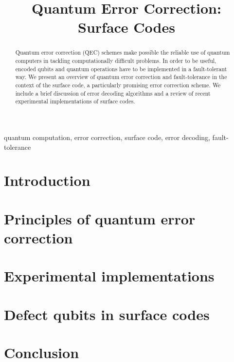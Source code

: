 \documentclass[conference]{IEEEtran}
\begin{document}
\title{Quantum Error Correction: Surface Codes}

\author{

  \and

}

\maketitle


\begin{abstract}
  Quantum error correction (QEC) schemes make possible the reliable use of
  quantum computers in tackling computationally difficult problems. In order to
  be useful, encoded qubits and quantum operations have to be implemented in a
  fault-tolerant way. We present an overview of quantum error correction and
  fault-tolerance in the context of the surface code, a particularly promising
  error correction scheme. We include a brief discussion of error decoding
  algorithms and a review of recent experimental implementations of surface
  codes.
\end{abstract}

\begin{IEEEkeywords}
  quantum computation, error correction, surface code, error decoding,
  fault-tolerance
\end{IEEEkeywords}

\section{Introduction}


\section{Principles of quantum error correction}


\section{Experimental implementations}


\section{Defect qubits in surface codes}


\section{Conclusion}


\pagebreak
\printbibliography
\end{document}
